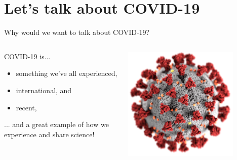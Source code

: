 \section[COVID-19]{Let's talk about COVID-19}
\label{sec:covid}

\begin{frame}{Why would we want to talk about COVID-19?}

\begin{columns}[c]
    \begin{column}{0.45\textwidth}
    
        COVID-19 is...
        
        \begin{itemize}
            \item something we've all experienced,
            \item international, and
            \item recent,
        \end{itemize}
            
        ... and a great example of how we experience and share science!
    \end{column}
        
    \begin{column}{0.45\textwidth}
        \centering
        \includegraphics[width=0.8\textwidth]{images/PHIL_23312_lowres.png}\\
    \end{column}

\end{columns}

\end{frame}

